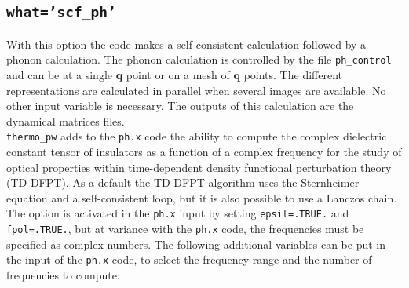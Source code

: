 \documentclass[12pt,a4paper]{article}
\begin{document}
\subsection{\color{web-blue}\texttt{what='scf\_ph'}}
With this option the code makes a self-consistent calculation followed
by a phonon calculation. The phonon calculation is controlled by the file
\texttt{ph\_control} and can be at a single {\bf q} point or on a mesh of 
{\bf q} points. 
The different representations are calculated in parallel when several images 
are available. No other input variable is necessary. The outputs of this 
calculation are the dynamical matrices files. \\
\texttt{thermo\_pw} adds to the \texttt{ph.x} code the ability to
compute the complex dielectric constant tensor of insulators as a function 
of a complex frequency for the study of optical properties within 
time-dependent density functional perturbation theory (TD-DFPT). 
As a default the TD-DFPT algorithm uses the Sternheimer equation and 
a self-consistent loop, but it is also possible to use a Lanczos chain.
The option is activated in the \texttt{ph.x} input by setting 
\texttt{epsil=.TRUE.} and \texttt{fpol=.TRUE.}, but at variance with
the \texttt{ph.x} code, the frequencies must be specified as complex numbers.
The following additional variables can be put in the input of the \texttt{ph.x}
code, to select the frequency range and the number of frequencies to compute:
\end{document}
